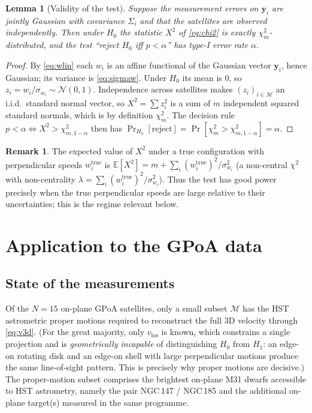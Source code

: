 \documentclass{amsart}
\newtheorem{lemma}{Lemma}
\theoremstyle{definition}
\newtheorem{remark}{Remark}
\begin{document}
\begin{lemma}[Validity of the test]\label{lem:valid}
Suppose the measurement errors on $\bm y_i$ are jointly Gaussian with
covariance $\Sigma_i$ and that the satellites are observed independently.
Then under $H_0$ the statistic $X^2$ of \eqref{eq:chi2} is exactly
$\chi^2_m$-distributed, and the test ``reject $H_0$ iff $p<\alpha$'' has
type-I error rate $\alpha$.
\end{lemma}
\begin{proof}
By \eqref{eq:wlin} each $w_i$ is an affine functional of the Gaussian vector
$\bm y_i$, hence Gaussian; its variance is \eqref{eq:sigmaw}. Under $H_0$
its mean is $0$, so $z_i=w_i/\sigma_{w_i}\sim\mathcal N(0,1)$. Independence
across satellites makes $(z_i)_{i\in\mathcal M}$ an i.i.d.\ standard normal
vector, so $X^2=\sum z_i^2$ is a sum of $m$ independent squared standard
normals, which is by definition $\chi^2_m$. The decision rule
$p<\alpha\Leftrightarrow X^2>\chi^2_{m,1-\alpha}$ then has
$\Pr_{H_0}[\text{reject}]=\Pr[\chi^2_m>\chi^2_{m,1-\alpha}]=\alpha$.
\end{proof}

\begin{remark}\label{rem:power}
The expected value of $X^2$ under a true configuration with perpendicular
speeds $w_i^{\mathrm{true}}$ is
$\mathbb E[X^2]=m+\sum_{i}(w_i^{\mathrm{true}})^2/\sigma_{w_i}^2$ (a
non-central $\chi^2$ with non-centrality
$\lambda=\sum_i (w_i^{\mathrm{true}})^2/\sigma_{w_i}^2$). Thus the test has
good power precisely when the true perpendicular speeds are large relative
to their uncertainties; this is the regime relevant below.
\end{remark}

\section{Application to the GPoA data}

\subsection{State of the measurements}
Of the $N=15$ on-plane GPoA satellites, only a small subset $\mathcal M$ has
the HST astrometric proper motions required to reconstruct the full 3D
velocity through \eqref{eq:v3d}. (For the great majority, only
$v_{\mathrm{los}}$ is known, which constrains a single projection and is
\emph{geometrically incapable} of distinguishing $H_0$ from $H_1$: an
edge-on rotating disk and an edge-on shell with large perpendicular motions
produce the same line-of-sight pattern. This is precisely why proper
motions are decisive.) The proper-motion subset comprises the brightest
on-plane M31 dwarfs accessible to HST astrometry, namely the pair
NGC\,147 / NGC\,185 and the additional on-plane target(s) measured in the
same programme.
\end{document}
